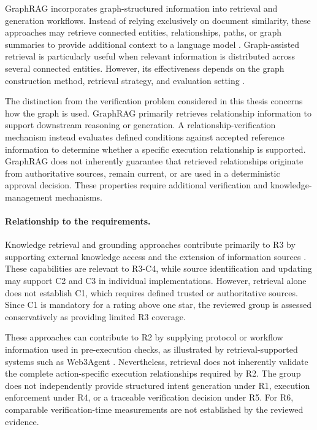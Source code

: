 GraphRAG incorporates graph-structured information into
retrieval and generation workflows. Instead of relying
exclusively on document similarity, these approaches may
retrieve connected entities, relationships, paths, or graph
summaries to provide additional context to a language model
\cite{hanRetrievalAugmentedGenerationGraphs2025}. Graph-assisted retrieval is particularly useful when
relevant information is distributed across several
connected entities. However, its effectiveness depends
on the graph construction method, retrieval strategy,
and evaluation setting
\cite{hanRAGGraphRAGSystematic2025,
hanRAGVsGraphRAG2026}.

The distinction from the verification problem considered
in this thesis concerns how the graph is used. GraphRAG
primarily retrieves relationship information to support
downstream reasoning or generation. A relationship-verification
mechanism instead evaluates defined conditions against
accepted reference information to determine whether a
specific execution relationship is supported. GraphRAG does not inherently guarantee that retrieved
relationships originate from authoritative sources, remain
current, or are used in a deterministic approval decision.
These properties require additional verification and
knowledge-management mechanisms.

\paragraph{Relationship to the requirements.}

Knowledge retrieval and grounding approaches contribute
primarily to R3 by supporting external knowledge access
and the extension of information sources
\cite{lewisRetrievalAugmentedGeneration2020,
hanRetrievalAugmentedGenerationGraphs2025}.
These capabilities are relevant to R3-C4, while source
identification and updating may support C2 and C3 in
individual implementations. However, retrieval alone
does not establish C1, which requires defined trusted
or authoritative sources. Since C1 is mandatory for a
rating above one star, the reviewed group is assessed
conservatively as providing limited R3 coverage.

These approaches can contribute to R2 by supplying
protocol or workflow information used in pre-execution
checks, as illustrated by retrieval-supported systems
such as Web3Agent \cite{TODO_Web3Agent}. Nevertheless,
retrieval does not inherently validate the complete
action-specific execution relationships required by R2.
The group does not independently provide structured
intent generation under R1, execution enforcement under
R4, or a traceable verification decision under R5.
For R6, comparable verification-time measurements are
not established by the reviewed evidence.

